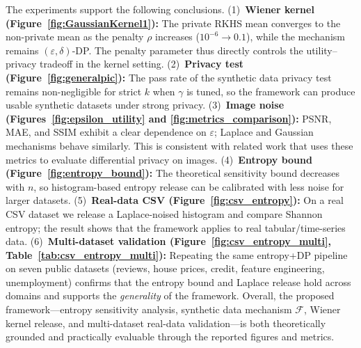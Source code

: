 \documentclass[journal,transmag]{IEEEtran}
\begin{document}
The experiments support the following conclusions. (1)~\textbf{Wiener kernel (Figure~\ref{fig:GaussianKernel1}):} The private RKHS mean converges to the non-private mean as the penalty $\rho$ increases ($10^{-6} \to 0.1$), while the mechanism remains $(\varepsilon,\delta)$-DP. The penalty parameter thus directly controls the utility--privacy tradeoff in the kernel setting. (2)~\textbf{Privacy test (Figure~\ref{fig:generalpic}):} The pass rate of the synthetic data privacy test remains non-negligible for strict $k$ when $\gamma$ is tuned, so the framework can produce usable synthetic datasets under strong privacy. (3)~\textbf{Image noise (Figures~\ref{fig:epsilon_utility} and \ref{fig:metrics_comparison}):} PSNR, MAE, and SSIM exhibit a clear dependence on $\varepsilon$; Laplace and Gaussian mechanisms behave similarly. This is consistent with related work that uses these metrics to evaluate differential privacy on images. (4)~\textbf{Entropy bound (Figure~\ref{fig:entropy_bound}):} The theoretical sensitivity bound decreases with $n$, so histogram-based entropy release can be calibrated with less noise for larger datasets. (5)~\textbf{Real-data CSV (Figure~\ref{fig:csv_entropy}):} On a real CSV dataset we release a Laplace-noised histogram and compare Shannon entropy; the result shows that the framework applies to real tabular/time-series data. (6)~\textbf{Multi-dataset validation (Figure~\ref{fig:csv_entropy_multi}, Table~\ref{tab:csv_entropy_multi}):} Repeating the same entropy+DP pipeline on seven public datasets (reviews, house prices, credit, feature engineering, unemployment) confirms that the entropy bound and Laplace release hold across domains and supports the \emph{generality} of the framework. Overall, the proposed framework---entropy sensitivity analysis, synthetic data mechanism $\mathcal{F}$, Wiener kernel release, and multi-dataset real-data validation---is both theoretically grounded and practically evaluable through the reported figures and metrics.
\end{document}
